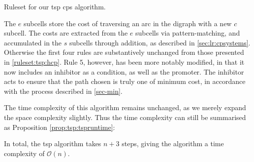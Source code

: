 \begin{cprulesetfloat}
    \begin{cpruleset}
        
        
        
        
        
        
    \end{cpruleset}
    \caption[Ruleset for the ]{\label{ruleset:tsp:tsp}Ruleset for our \gls{tsp} \gls{cps} algorithm.}
\end{cprulesetfloat}

The \(e\) subcells store the cost of traversing an arc in the digraph with a new \(c\) subcell.  The costs are extracted from the \(e\) subcells via pattern-matching, and accumulated in the \(s\) subcells through addition, as described in \autoref{sec:lr:cpsystems}. Otherwise the first four rules are substantively unchanged from those presented in \autoref{ruleset:tsp:hcp}.  Rule 5, however, has been more notably modified, in that it now includes an inhibitor as a condition, as well as the promoter.  The inhibitor acts to ensure that the path chosen is truly one of minimum cost, in accordance with the process described in \autoref{sec-min}.

The time complexity of this algorithm remains unchanged, as we merely expand the space complexity slightly.  Thus the time complexity can still be summarised as Proposition \ref{prop:tsp:tspruntime}:

\begin{proposition}
In total, the \gls{tsp} algorithm takes \(n + 3\) steps, giving the algorithm a time complexity of \(\mathcal{O}(n)\).
\label{prop:tsp:tspruntime}
\end{proposition}